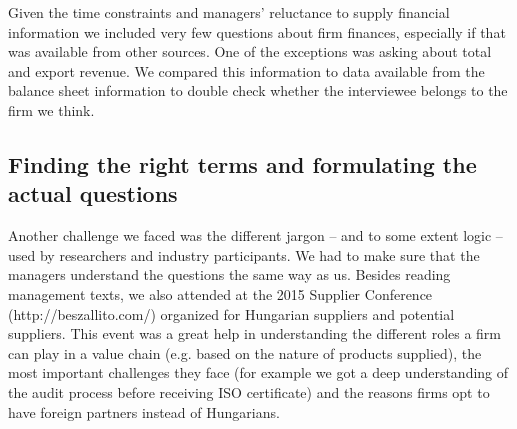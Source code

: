 \documentclass[final, dvipsnames, authoryear,12pt]{elsarticle}
\begin{document}




Given the time constraints and managers' reluctance to supply financial information \citep{Bloom2014-hc} we included very few questions about firm finances, especially if that was available from other sources. One of the exceptions was asking about total and export revenue. We compared this information to data available from the balance sheet information to double check whether the interviewee belongs to the firm we think. 


\subsection{Finding the right terms and formulating the actual questions}
\label{sec:terms}

Another challenge we faced was the different jargon -- and to some extent logic -- used by researchers and industry participants. We had to make sure that the managers understand the questions the same way as us. Besides reading management texts, we also attended at the 2015 Supplier Conference (http://beszallito.com/) organized for Hungarian suppliers and potential suppliers. This event was a great help in understanding the different roles a firm can play in a value chain (e.g. based on the nature of products supplied), the most important challenges they face (for example we got a deep understanding of the audit process before receiving ISO certificate) and the reasons firms opt to have foreign partners instead of Hungarians.
\end{document}
